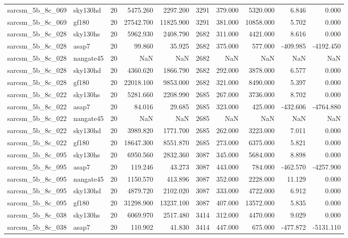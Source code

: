 \begin{longtable}{llrrrrrrrr}
sarcsm\_5b\_8c\_069 & sky130hd & 20 & 5475.260 & 2297.200 & 3291 & 379.000 & 5320.000 & 6.846 & 0.000 \\
sarcsm\_5b\_8c\_069 & gf180 & 20 & 27542.700 & 11825.900 & 3291 & 381.000 & 10858.000 & 5.702 & 0.000 \\
sarcsm\_5b\_8c\_028 & sky130hs & 20 & 5962.930 & 2408.790 & 2682 & 311.000 & 4421.000 & 8.616 & 0.000 \\
sarcsm\_5b\_8c\_028 & asap7 & 20 & 99.860 & 35.925 & 2682 & 375.000 & 577.000 & -409.985 & -4192.450 \\
sarcsm\_5b\_8c\_028 & nangate45 & 20 & NaN & NaN & 2682 & NaN & NaN & NaN & NaN \\
sarcsm\_5b\_8c\_028 & sky130hd & 20 & 4360.620 & 1866.790 & 2682 & 292.000 & 3878.000 & 6.577 & 0.000 \\
sarcsm\_5b\_8c\_028 & gf180 & 20 & 22018.100 & 9853.000 & 2682 & 321.000 & 8490.000 & 5.397 & 0.000 \\
sarcsm\_5b\_8c\_022 & sky130hs & 20 & 5281.660 & 2208.990 & 2685 & 267.000 & 3736.000 & 8.702 & 0.000 \\
sarcsm\_5b\_8c\_022 & asap7 & 20 & 84.016 & 29.685 & 2685 & 323.000 & 425.000 & -432.606 & -4764.880 \\
sarcsm\_5b\_8c\_022 & nangate45 & 20 & NaN & NaN & 2685 & NaN & NaN & NaN & NaN \\
sarcsm\_5b\_8c\_022 & sky130hd & 20 & 3989.820 & 1771.700 & 2685 & 262.000 & 3223.000 & 7.011 & 0.000 \\
sarcsm\_5b\_8c\_022 & gf180 & 20 & 18647.300 & 8551.870 & 2685 & 273.000 & 6375.000 & 5.821 & 0.000 \\
sarcsm\_5b\_8c\_095 & sky130hs & 20 & 6950.560 & 2832.360 & 3087 & 345.000 & 5684.000 & 8.898 & 0.000 \\
sarcsm\_5b\_8c\_095 & asap7 & 20 & 119.246 & 43.273 & 3087 & 443.000 & 784.000 & -462.570 & -4257.900 \\
sarcsm\_5b\_8c\_095 & nangate45 & 20 & 1150.570 & 413.896 & 3087 & 352.000 & 2228.000 & 11.129 & 0.000 \\
sarcsm\_5b\_8c\_095 & sky130hd & 20 & 4879.720 & 2102.020 & 3087 & 333.000 & 4722.000 & 6.912 & 0.000 \\
sarcsm\_5b\_8c\_095 & gf180 & 20 & 31298.900 & 13237.100 & 3087 & 407.000 & 13572.000 & 5.835 & 0.000 \\
sarcsm\_5b\_8c\_038 & sky130hs & 20 & 6069.970 & 2517.480 & 3414 & 312.000 & 4470.000 & 9.029 & 0.000 \\
sarcsm\_5b\_8c\_038 & asap7 & 20 & 110.902 & 41.830 & 3414 & 447.000 & 675.000 & -477.872 & -5131.110 \\

\end{longtable}

